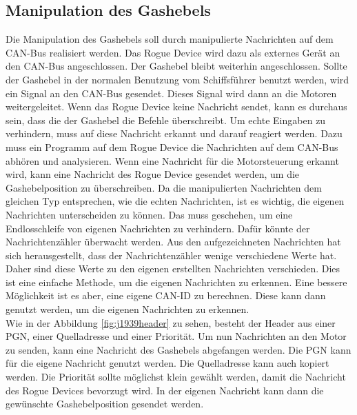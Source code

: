 \subsection{Manipulation des Gashebels}
Die Manipulation des Gashebels soll durch manipulierte Nachrichten auf dem CAN-Bus realisiert werden.
Das Rogue Device wird dazu als externes Gerät an den CAN-Bus angeschlossen. Der Gashebel bleibt weiterhin angeschlossen.
Sollte der Gashebel in der normalen Benutzung vom Schiffsführer benutzt werden, wird ein Signal an den CAN-Bus gesendet. 
Dieses Signal wird dann an die Motoren weitergeleitet. Wenn das Rogue Device keine Nachricht sendet, kann es durchaus sein, dass
die der Gashebel die Befehle überschreibt.
Um echte Eingaben zu verhindern, muss auf diese Nachricht erkannt und darauf reagiert werden. 
Dazu muss ein Programm auf dem Rogue Device die Nachrichten auf dem CAN-Bus abhören und analysieren.
Wenn eine Nachricht für die Motorsteuerung erkannt wird, kann eine Nachricht des Rogue Device gesendet werden, um die Gashebelposition
zu überschreiben. 
Da die manipulierten Nachrichten dem gleichen Typ entsprechen, wie die echten Nachrichten, ist es wichtig, die eigenen Nachrichten
unterscheiden zu können.
Das muss geschehen, um eine Endlosschleife von eigenen Nachrichten zu verhindern. Dafür könnte
der Nachrichtenzähler überwacht werden. Aus den aufgezeichneten Nachrichten hat sich herausgestellt, dass der 
Nachrichtenzähler wenige verschiedene Werte hat. Daher sind diese Werte zu den eigenen erstellten Nachrichten 
verschieden. Dies ist eine einfache Methode, um die eigenen Nachrichten zu erkennen. Eine bessere Möglichkeit ist es aber,
eine eigene CAN-ID zu berechnen. Diese kann dann genutzt werden, um die eigenen Nachrichten zu erkennen. \\
Wie in der Abbildung \ref{fig:j1939header} zu sehen, besteht der Header aus einer PGN, einer Quelladresse und einer Priorität. Um nun Nachrichten
an den Motor zu senden, kann eine Nachricht des Gashebels abgefangen werden. Die PGN kann für die eigene Nachricht genutzt
werden. Die Quelladresse kann auch kopiert werden. Die Priorität sollte möglichst klein gewählt werden, 
damit die Nachricht des Rogue Devices bevorzugt wird. In der eigenen Nachricht kann dann die gewünschte Gashebelposition gesendet werden.

